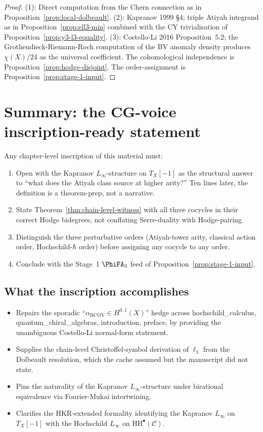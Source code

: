 \documentclass[11pt]{article}
\providecommand{\BCOV}{\mathrm{BCOV}}
\providecommand{\HH}{\mathrm{HH}}
\providecommand{\cC}{\mathcal{C}}
\begin{document}
\begin{proof}
(1): Direct computation from the Chern connection as in Proposition~\ref{prop:local-dolbeault}.
(2): Kapranov 1999 \S 4; triple Atiyah integrand as in Proposition~\ref{prop:ell3-min} combined with the CY trivialisation of Proposition~\ref{prop:y3-l3-equality}.
(3): Costello-Li 2016 Proposition~5.2; the Grothendieck-Riemann-Roch computation of the BV anomaly density produces $\chi(X)/24$ as the universal coefficient.
The cohomological independence is Proposition~\ref{prop:hodge-disjoint}.
The order-assignment is Proposition~\ref{prop:stage-1-input}.
\end{proof}

\section{Summary: the CG-voice inscription-ready statement}
\label{sec:summary-statement}

Any chapter-level inscription of this material must:
\begin{enumerate}[label=(\alph*)]
\item Open with the Kapranov $L_\infty$-structure on $T_X[-1]$ as the
structural answer to ``what does the Atiyah class source at higher
arity?'' Ten lines later, the definition is a theorem-prep, not a narrative.
\item State Theorem~\ref{thm:chain-level-witness} with all three
cocycles in their correct Hodge bidegrees, not conflating Serre-duality
with Hodge-pairing.
\item Distinguish the three perturbative orders (Atiyah-tower arity,
classical action order, Hochschild-$\hbar$ order) before assigning any
cocycle to any order.
\item Conclude with the Stage~1 $\PhiFA_3$ feed of
Proposition~\ref{prop:stage-1-input}.
\end{enumerate}

\subsection*{What the inscription accomplishes}

\begin{itemize}
\item Repairs the sporadic ``$\alpha_\BCOV \in H^{0,1}(X)$'' hedge across
hochschild\_calculus, quantum\_chiral\_algebras, introduction, preface,
by providing the unambiguous Costello-Li normal-form statement.
\item Supplies the chain-level Christoffel-symbol derivation of
$\ell_3$ from the Dolbeault resolution, which the cache assumed but the
manuscript did not state.
\item Pins the naturality of the Kapranov $L_\infty$-structure under
birational equivalence via Fourier-Mukai intertwining.
\item Clarifies the HKR-extended formality identifying the Kapranov
$L_\infty$ on $T_X[-1]$ with the Hochschild $L_\infty$ on $\HH^\bullet(\cC)$.
\end{itemize}
\end{document}
